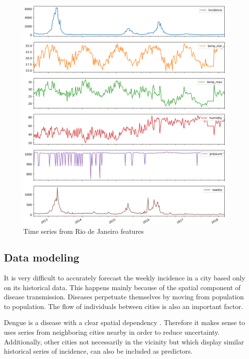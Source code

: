 \documentclass[12pt]{report}
\begin{document}
\begin{figure}
 \centering
 \includegraphics[width=\textwidth]{rio_raw_series.png}
 \caption{Time series from Rio de Janeiro features}
 \label{fig: rio_raw}
\end{figure}



\subsection{Data modeling}

It is very difficult to accurately forecast the weekly incidence in a city based only on its historical data. This happens mainly because of the spatial component of disease transmission. Diseases perpetuate themselves by moving from population to population. The flow of individuals between cities is also an important factor.

Dengue is a disease with a clear spatial dependency \citep{stoddard2013house,eisen2009use}. Therefore it makes sense to uses series from neighboring cities nearby in order to reduce uncertainty. Additionally, other cities not necessarily in the vicinity but which display similar historical series of incidence, can also be included as predictors.
\end{document}
